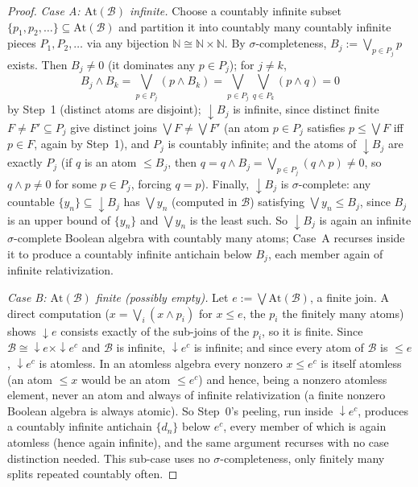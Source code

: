 \documentclass[10pt,a4paper]{amsart}
\newcommand{\nat}{\mathbb N}
\begin{document}
\begin{proof}
\emph{Case A: $\mathrm{At}(\mathcal B)$ infinite.} Choose a countably
infinite subset $\{p_1,p_2,\dots\}\subseteq\mathrm{At}(\mathcal B)$ and
partition it into countably many countably infinite pieces
$P_1,P_2,\dots$ via any bijection $\nat\cong\nat\times\nat$. By
$\sigma$-completeness, $B_j:=\bigvee_{p\in P_j}p$ exists. Then $B_j\neq0$
(it dominates any $p\in P_j$); for $j\neq k$,
\[
B_j\wedge B_k=\bigvee_{p\in P_j}(p\wedge B_k)
=\bigvee_{p\in P_j}\bigvee_{q\in P_k}(p\wedge q)=0
\]
by Step~1 (distinct atoms are disjoint); ${\downarrow}B_j$ is infinite,
since distinct finite $F\neq F'\subseteq P_j$ give distinct joins
$\bigvee F\neq\bigvee F'$ (an atom $p\in P_j$ satisfies $p\leq\bigvee F$
iff $p\in F$, again by Step~1), and $P_j$ is countably infinite; and the
atoms of ${\downarrow}B_j$ are exactly $P_j$ (if $q$ is an atom
$\leq B_j$, then $q=q\wedge B_j=\bigvee_{p\in P_j}(q\wedge p)\neq0$, so
$q\wedge p\neq0$ for some $p\in P_j$, forcing $q=p$). Finally,
${\downarrow}B_j$ is $\sigma$-complete: any countable
$\{y_n\}\subseteq{\downarrow}B_j$ has $\bigvee y_n$ (computed in
$\mathcal B$) satisfying $\bigvee y_n\leq B_j$, since $B_j$ is an upper
bound of $\{y_n\}$ and $\bigvee y_n$ is the least such. So
${\downarrow}B_j$ is again an infinite $\sigma$-complete Boolean algebra
with countably many atoms; Case~A recurses inside it to produce a
countably infinite antichain below $B_j$, each member again of infinite
relativization.

\emph{Case B: $\mathrm{At}(\mathcal B)$ finite (possibly empty).} Let
$e:=\bigvee\mathrm{At}(\mathcal B)$, a finite join. A direct computation
($x=\bigvee_i(x\wedge p_i)$ for $x\leq e$, the $p_i$ the finitely many
atoms) shows ${\downarrow}e$ consists exactly of the sub-joins of the
$p_i$, so it is finite. Since $\mathcal B\cong{\downarrow}e\times
{\downarrow}e^c$ and $\mathcal B$ is infinite, ${\downarrow}e^c$ is
infinite; and since every atom of $\mathcal B$ is $\leq e$,
${\downarrow}e^c$ is atomless. In an atomless algebra every nonzero
$x\leq e^c$ is itself atomless (an atom $\leq x$ would be an atom
$\leq e^c$) and hence, being a nonzero atomless element, never an atom
and always of infinite relativization (a finite nonzero Boolean algebra
is always atomic). So Step~0's peeling, run inside ${\downarrow}e^c$,
produces a countably infinite antichain $\{d_n\}$ below $e^c$, every
member of which is again atomless (hence again infinite), and the same
argument recurses with no case distinction needed. This sub-case uses no
$\sigma$-completeness, only finitely many splits repeated countably
often.


\end{proof}
\end{document}
